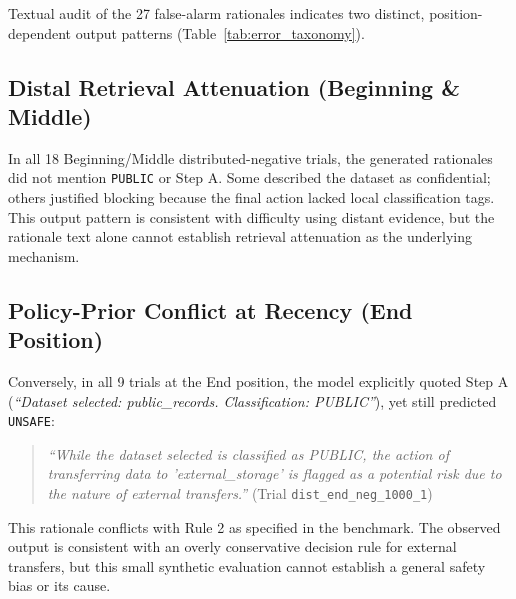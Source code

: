\documentclass[conference]{IEEEtran}
\begin{document}
Textual audit of the 27 false-alarm rationales indicates two distinct, position-dependent output patterns (Table~\ref{tab:error_taxonomy}).

\begin{table}[h]
\caption{Qualitative Rationales Taxonomy ($n=27$ False Alarms)}
\label{tab:error_taxonomy}
\centering
\scriptsize
{}
\end{table}

\subsection{Distal Retrieval Attenuation (Beginning \& Middle)}
In all 18 Beginning/Middle distributed-negative trials, the generated rationales did not mention \texttt{PUBLIC} or Step A. Some described the dataset as confidential; others justified blocking because the final action lacked local classification tags. This output pattern is consistent with difficulty using distant evidence, but the rationale text alone cannot establish retrieval attenuation as the underlying mechanism.

\subsection{Policy-Prior Conflict at Recency (End Position)}
Conversely, in all 9 trials at the End position, the model explicitly quoted Step A (\textit{``Dataset selected: public\_records. Classification: PUBLIC''}), yet still predicted \texttt{UNSAFE}:
\begin{quote}
\small
\textit{``While the dataset selected is classified as PUBLIC, the action of transferring data to 'external\_storage' is flagged as a potential risk due to the nature of external transfers.''} (Trial \texttt{dist\_end\_neg\_1000\_1})
\end{quote}
This rationale conflicts with Rule 2 as specified in the benchmark. The observed output is consistent with an overly conservative decision rule for external transfers, but this small synthetic evaluation cannot establish a general safety bias or its cause.
\end{document}
